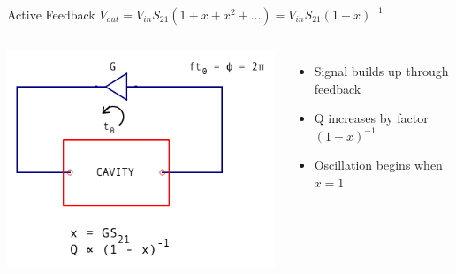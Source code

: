 \documentclass{beamer}
\begin{document}
\begin{frame}{Active Feedback}
{$V_{out} = V_{in}S_{21}(1 + x + x^2 + \ldots) = V_{in}S_{21}(1-x)^{-1}$}
\begin{columns}
\centering
\includegraphics[width=\textwidth]{nonlinear_scaling}
\begin{itemize}
\item Signal builds up through feedback 
\item Q increases by factor $(1-x)^{-1}$
\item Oscillation begins when $x=1$
\end{itemize}
\end{columns}
\end{frame}

%
%
%
%
%
\end{document}
